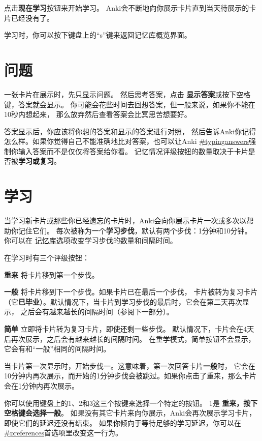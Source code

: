 \documentclass[a4paper]{book}
\begin{document}
	点击\textbf{现在学习}按钮来开始学习。 Anki会不断地向你展示卡片直到当天待展示的卡片已经没有了。
	
	学习时，你可以按下键盘上的“s”键来返回记忆库概览界面。
	
	\section{问题}
	
	一张卡片在展示时，先只显示问题。 然后思考答案，点击
	\textbf{显示答案}或按下空格键，答案就会显示。 你可能会花些时间去回想答案，但一般来说，如果你不能在10秒内想起来， 那么放弃然后查看答案会比冥思苦想要好。
	
	答案显示后，你应该将你想的答案和显示的答案进行对照， 然后告诉Anki你记得怎么样。如果你觉得自己不能准确地比对答案，也可以让Anki
	\url{#typinganswers}强制你输入答案而不是仅仅将答案给你看。
	记忆情况评级按钮的数量取决于卡片是否被\textbf{学习或复习}。
	
	\section{学习}\label{studydeck}
	
	当学习新卡片或那些你已经遗忘的卡片时，Anki会向你展示卡片一次或多次以帮助你记住它们。 每次被称为一个\textbf{学习步伐}，默认有两个步伐：1分钟和10分钟。 你可以在
	\hyperref[deckoptions]{记忆库}选项改变学习步伐的数量和间隔时间。
	
	在学习时有三个评级按钮：
	
	\textbf{重来} 将卡片移到第一个步伐。
	
	\textbf{一般} 将卡片移到下一个步伐。如果卡片已在最后一个步伐， 卡片被转为复习卡片（它\textbf{已毕业}）。默认情况下，当卡片到学习步伐的最后时，它会在第二天再次显示， 之后会有越来越长的间隔时间（参阅下一部分）。
	
	\textbf{简单} 立即将卡片转为复习卡片，即使还剩一些步伐。 默认情况下，卡片会在4天后再次展示，之后会有越来越长的间隔时间。 在重学模式，简单按钮不会显示，它会有和“一般”相同的间隔时间。
	
	当卡片第一次显示时，开始步伐一。这意味着，第一次回答卡片\textbf{一般}时， 它会在10分钟内再次展示，而开始的1分钟步伐会被跳过。如果你点击了重来，那么卡片会在1分钟内再次展示。
	
	你可以使用键盘上的1、2和3这三个按键来选择一个特定的按钮。 1是
	\textbf{重来，按下空格键会选择一般}。
	如果没有其它卡片来向你展示，Anki会再次展示学习卡片，即使它们的延迟还没有结束。 如果你倾向于等待足够的学习延迟，你可以在
	\url{#preferences}首选项里改变这一行为。
	
\end{document}
